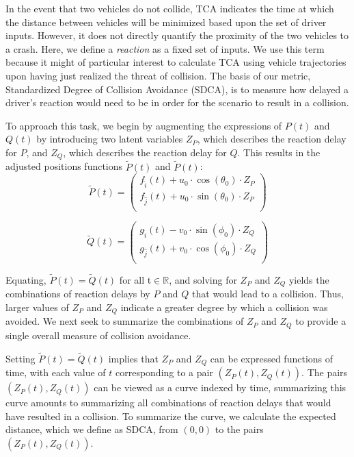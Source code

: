 \documentclass{article}
\begin{document}
In the event that two vehicles do not collide, TCA indicates the time at which the distance between vehicles will be minimized based upon the set of driver inputs. However, it does not directly quantify the proximity of the two vehicles to a crash. Here, we define a \textit{reaction} as a fixed set of inputs.  We use this term because it might of particular interest to calculate TCA using vehicle trajectories upon having just realized the threat of collision.  The basis of our metric, Standardized Degree of Collision Avoidance (SDCA), is to measure how delayed a driver's reaction would need to be in order for the scenario to result in a collision. 

To approach this task, we begin by augmenting the expressions of $P(t)$ and $Q(t)$ by introducing two latent variables $Z_P$, which describes the reaction delay for $P$, and $Z_Q$, which describes the reaction delay for $Q$. This results in the adjusted positions functions $\tilde{P}(t)$ and $\tilde{P}(t)$:
\begin{equation}
    \tilde{P}(t) =
  \left( {\begin{array}{c}
   f_{\hat{i}}(t) + u_0\cdot\cos(\theta_0)\cdot Z_P\\
   f_{\hat{j}}(t) + u_0\cdot\sin(\theta_0)\cdot Z_P \\
  \end{array} } \right)
  \label{pdot}
\end{equation}

\begin{equation}
   \tilde{Q}(t) =
  \left( {\begin{array}{c}
   g_{\hat{i}}(t) - v_0\cdot\sin(\phi_0)\cdot Z_Q\\
   g_{\hat{j}}(t) + v_0\cdot\cos(\phi_0)\cdot Z_Q\\
  \end{array} } \right)
  \label{qdot}
\end{equation}

Equating, $\tilde{P}(t) = \tilde{Q}(t)$ for all t$\in\mathbb{R}$, and solving for $Z_P$ and $Z_Q$ yields the combinations of reaction delays by $P$ and $Q$ that would lead to a collision.  Thus, larger values of $Z_P$ and $Z_Q$ indicate a greater degree by which a collision was avoided.  We next seek to summarize the combinations of $Z_P$ and $Z_Q$ to provide a single overall measure of collision avoidance.

Setting $\tilde{P}(t) = \tilde{Q}(t)$ implies that $Z_P$ and $Z_Q$ can be expressed functions of time, with each value of $t$ corresponding to a pair $(Z_P(t), Z_Q(t) )$.  The pairs $(Z_P(t), Z_Q(t))$ can be viewed as a curve indexed by time, summarizing this curve amounts to summarizing all combinations of reaction delays that would have resulted in a collision. To summarize the curve, we calculate the expected distance, which we define as SDCA, from $(0,0)$ to the pairs $(Z_P(t), Z_Q(t))$. 
\end{document}
